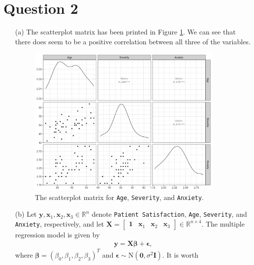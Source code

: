 \documentclass[10pt]{article}
\begin{document}
\section{Question 2} \noindent
\begin{itemize}
    \item[(a)] The scatterplot matrix has been printed in Figure \ref{ps-scatterplot}. We can see that there does seem to be a positive correlation between
    all three of the variables. 
    \begin{figure}
        \centering
        \includegraphics[width = 0.9\textwidth]{img/ps-correlation.png}
        \caption{The scatterplot matrix for \texttt{Age}, \texttt{Severity}, and \texttt{Anxiety}.}
        \label{ps-scatterplot}
    \end{figure}
    \item[(b)] Let \(\mathbf{y}, \mathbf{x}_1, \mathbf{x}_2, \mathbf{x}_3 \in \mathbb{R}^n\) denote \texttt{Patient Satisfaction}, \texttt{Age},
    \texttt{Severity}, and \texttt{Anxiety}, respectively, and let 
    \(\mathbf{X} = \begin{bmatrix}
        \mathbf{1} & \mathbf{x}_1 & \mathbf{x}_2 & \mathbf{x}_3
    \end{bmatrix} \in \mathbb{R}^{n \times 4}\).
    The multiple regression model is given by 
    \begin{align}
        \mathbf{y} =  \mathbf{X}\bm{\beta} + \bm{\epsilon},
    \end{align}
    where \(\bm{\beta} = (\beta_0, \beta_1, \beta_2, \beta_3)^T\) and \(\bm{\epsilon} \sim \mathrm{N}(\mathbf{0}, \sigma^2 \mathbf{I})\). It is worth 

\end{itemize}
\end{document}
